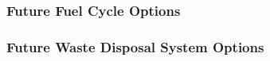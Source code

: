 

\begin{frame}[ctb!]
  \frametitle{Future Fuel Cycle Options}
\end{frame}


\begin{frame}[ctb!]
  \frametitle{Future Waste Disposal System Options}
\end{frame}
